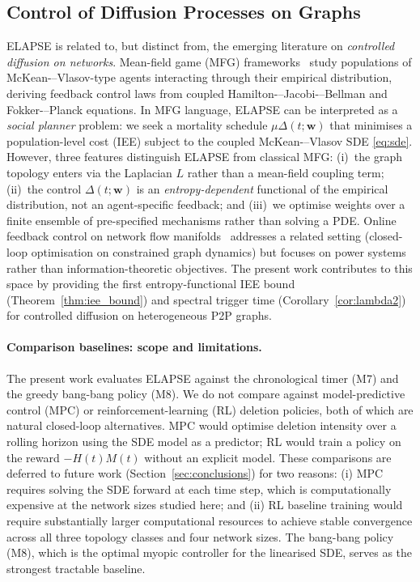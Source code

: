 \documentclass[review,12pt]{elsarticle}
\newcommand{\bfw}{\mathbf{w}}
\begin{document}
\subsection{Control of Diffusion Processes on Graphs}

ELAPSE is related to, but distinct from, the emerging literature on
\emph{controlled diffusion on networks}.
Mean-field game (MFG) frameworks~\cite{carmona2018probabilistic,achdou2020mean}
study populations of McKean-–Vlasov-type agents interacting through their
empirical distribution, deriving feedback control laws from coupled
Hamilton-–Jacobi-–Bellman and Fokker-–Planck equations.
In MFG language, ELAPSE can be interpreted as a \emph{social planner}
problem: we seek a mortality schedule $\mu\Delta(t;\bfw)$ that minimises
a population-level cost (IEE) subject to the coupled McKean-–Vlasov SDE
\eqref{eq:sde}.  However, three features distinguish ELAPSE from classical
MFG: (i)~the graph topology enters via the Laplacian $L$ rather than a
mean-field coupling term; (ii)~the control $\Delta(t;\bfw)$ is an
\emph{entropy-dependent} functional of the empirical distribution, not an
agent-specific feedback; and (iii)~we optimise weights over a finite
ensemble of pre-specified mechanisms rather than solving a PDE.
Online feedback control on network flow
manifolds~\cite{bianchin2021online} addresses a related setting (closed-loop
optimisation on constrained graph dynamics) but focuses on power systems
rather than information-theoretic objectives.
The present work contributes to this space by providing the first
entropy-functional IEE bound (Theorem~\ref{thm:iee_bound}) and spectral
trigger time (Corollary~\ref{cor:lambda2}) for controlled diffusion on
heterogeneous P2P graphs.

\paragraph{Comparison baselines: scope and limitations.}
The present work evaluates ELAPSE against the chronological timer (M7)
and the greedy bang-bang policy (M8).  We do not compare against
model-predictive control (MPC) or reinforcement-learning (RL) deletion
policies, both of which are natural closed-loop alternatives.  MPC would
optimise deletion intensity over a rolling horizon using the SDE model as
a predictor; RL would train a policy on the reward $-H(t)M(t)$ without
an explicit model.  These comparisons are deferred to future work
(Section~\ref{sec:conclusions}) for two reasons: (i) MPC requires solving
the SDE forward at each time step, which is computationally expensive
at the network sizes studied here; and (ii) RL baseline training would
require substantially larger computational resources to achieve stable
convergence across all three topology classes and four network sizes.
The bang-bang policy (M8), which is the optimal myopic controller for
the linearised SDE, serves as the strongest tractable baseline.
\end{document}
